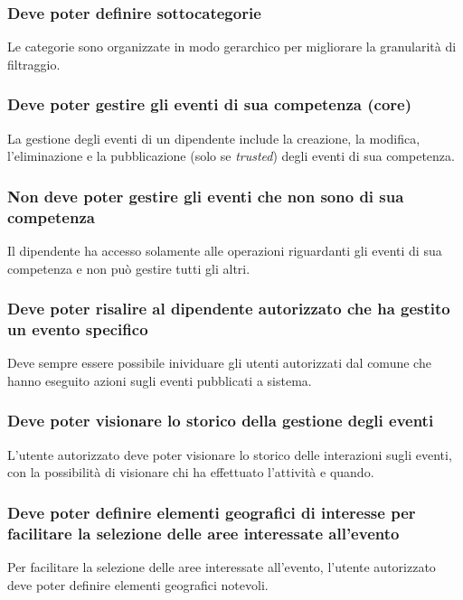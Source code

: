\documentclass{article}
\begin{document}
\subsubsection{Deve poter definire sottocategorie}
Le categorie sono organizzate in modo gerarchico per migliorare la granularità di filtraggio.

\subsubsection{Deve poter gestire gli eventi di sua competenza (core)}
La gestione degli eventi di un dipendente include la creazione, la modifica, l'eliminazione e la pubblicazione (solo se \textit{trusted}) degli eventi di sua competenza.

\subsubsection{Non deve poter gestire gli eventi che non sono di sua competenza}
Il dipendente ha accesso solamente alle operazioni riguardanti gli eventi di sua competenza e non può gestire tutti gli altri.

\subsubsection{Deve poter risalire al dipendente autorizzato che ha gestito un evento specifico}
Deve sempre essere possibile inividuare gli utenti autorizzati dal comune che hanno eseguito azioni sugli eventi pubblicati a sistema.

\subsubsection{Deve poter visionare lo storico della gestione degli eventi}
L'utente autorizzato deve poter visionare lo storico delle interazioni sugli eventi, con la possibilità di visionare chi ha effettuato l'attività e quando.

\subsubsection{Deve poter definire elementi geografici di interesse per facilitare la selezione delle aree interessate all'evento}
Per facilitare la selezione delle aree interessate all'evento, l'utente autorizzato deve poter definire elementi geografici notevoli.
\end{document}
